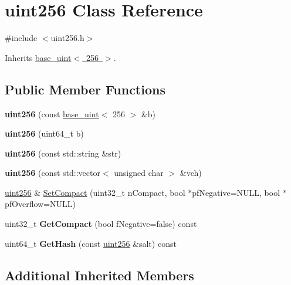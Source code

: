\hypertarget{classuint256}{}\section{uint256 Class Reference}
\label{classuint256}


{\ttfamily \#include $<$uint256.\+h$>$}



Inherits \mbox{\hyperlink{classbase__uint}{base\+\_\+uint$<$ 256 $>$}}.

\subsection*{Public Member Functions}
\begin{DoxyCompactItemize}
\item 
\mbox{\label{classuint256_af6d285b43ee909dd07448c0dba0c1606}} 
{\bfseries uint256} (const \mbox{\hyperlink{classbase__uint}{base\+\_\+uint}}$<$ 256 $>$ \&b)
\item 
\mbox{\label{classuint256_a1d340146fe2db1dfe45bc6c721e7588b}} 
{\bfseries uint256} (uint64\+\_\+t b)
\item 
\mbox{\label{classuint256_a4078e4911984722778f19581865462b9}} 
{\bfseries uint256} (const std\+::string \&str)
\item 
\mbox{\label{classuint256_a7cad0fc486ebc2ed02462d5a7d4e4f2d}} 
{\bfseries uint256} (const std\+::vector$<$ unsigned char $>$ \&vch)
\item 
\mbox{\hyperlink{classuint256}{uint256}} \& \mbox{\hyperlink{classuint256_a54bc91c8535c43f881bba1fdb11ca7fa}{Set\+Compact}} (uint32\+\_\+t n\+Compact, bool $\ast$pf\+Negative=N\+U\+LL, bool $\ast$pf\+Overflow=N\+U\+LL)
\item 
\mbox{\label{classuint256_a62d6d46078edb8cdb742e2430a3b1998}} 
uint32\+\_\+t {\bfseries Get\+Compact} (bool f\+Negative=false) const
\item 
\mbox{\label{classuint256_a6dfa79998c7cb7def7a6c7c0a6915c58}} 
uint64\+\_\+t {\bfseries Get\+Hash} (const \mbox{\hyperlink{classuint256}{uint256}} \&salt) const
\end{DoxyCompactItemize}
\subsection*{Additional Inherited Members}


